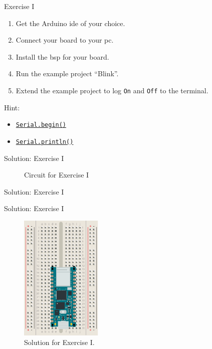 \begin{frame}
    \begin{exampleblock}{Exercise I}
        \begin{enumerate}
            \item Get the Arduino\textregistered{} \acs{ide} of your choice.
            \item Connect your board to your \acs{pc}.
            \item Install the \ac{bsp} for your board.
            \item Run the example project ``Blink''.
            \item Extend the example project to log \texttt{On} and \texttt{Off} to the terminal.%
        \end{enumerate}
        \par Hint:
        \begin{itemize}
            \item \href{https://www.arduino.cc/reference/en/language/functions/communication/serial/begin/}{\texttt{Serial.begin()}}
            \item \href{https://www.arduino.cc/reference/en/language/functions/communication/serial/println/}{\texttt{Serial.println()}}
        \end{itemize}
    \end{exampleblock}
\end{frame}

\begin{frame}{Solution: Exercise I}
    \begin{figure}
        \caption{Circuit for Exercise I}
    \end{figure}
\end{frame}

\begin{frame}{Solution: Exercise I}
    \begin{listing}[H]
        \caption{Solution for Exercise I.}
        \label{lst:arduino:exercise:1:solution}
    \end{listing}
\end{frame}

\begin{frame}{Solution: Exercise I}
    \begin{figure}
        \includegraphics[width=0.35\textwidth]{images/microcontroller/exercises/exercise-1-solution.pdf}
        \caption{Solution for Exercise I.}
    \end{figure}
\end{frame}
